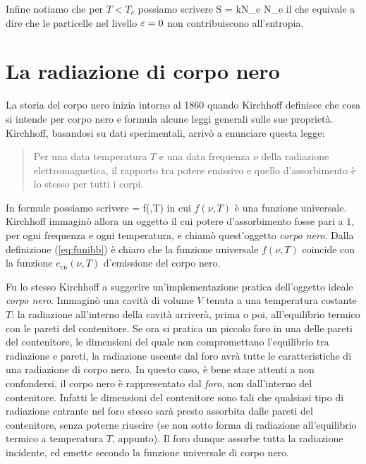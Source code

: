 Infine notiamo che per $T < T_c$ possiamo scrivere
\be
S = kN_e \propto N_e
\ee
il che equivale a dire che le particelle nel livello $\varepsilon = 0$ non contribuiscono all'entropia.


\section{La radiazione di corpo nero}

La storia del corpo nero inizia intorno al 1860 quando Kirchhoff definisce che
cosa si intende per corpo nero e formula alcune leggi generali sulle sue proprietà. Kirchhoff, basandosi su dati sperimentali, arrivò a enunciare questa legge:
\begin{quote}
Per una data temperatura $T$ e una data frequenza $\nu$ della radiazione elettromagnetica, il rapporto tra potere emissivo e quello d'assorbimento è lo stesso per tutti i corpi.
\end{quote}
In formule possiamo scrivere
\be
\label{eq:funibb}
 = f(\nu,T)
\ee
in cui $f(\nu,T)$ è una funzione universale. Kirchhoff immaginò allora un oggetto il cui potere d'assorbimento fosse pari a $1$, per ogni frequenza e ogni temperatura, e chiamò quest'oggetto {\em corpo nero}. Dalla definizione (\ref{eq:funibb}) è chiaro che la funzione universale $f(\nu,T)$ coincide con la funzione $e_{\text{cn}}(\nu,T)$ d'emissione del corpo nero.

Fu lo stesso Kirchhoff a suggerire un'implementazione pratica dell'oggetto ideale {\em corpo nero}. Immaginò una cavità di volume $V$ tenuta a una temperatura costante $T$: la radiazione all'interno della cavità arriverà, prima o poi, all'equilibrio termico con le pareti del contenitore. Se ora si pratica un piccolo foro in una delle pareti del contenitore, le dimensioni del quale non compromettano l'equilibrio tra radiazione e pareti, la radiazione uscente dal foro avrà tutte le caratteristiche di una radiazione di corpo nero. In questo caso, è bene stare attenti a non confondersi, il corpo nero è rappresentato dal {\em foro}, non dall'interno del contenitore. Infatti le dimensioni del contenitore sono tali che qualsiasi tipo di radiazione entrante nel foro stesso sarà presto assorbita dalle pareti del contenitore, senza poterne riuscire (se non sotto forma di radiazione all'equilibrio termico a temperatura $T$, appunto). Il foro dunque assorbe tutta la radiazione incidente, ed emette secondo la funzione universale di corpo nero.

